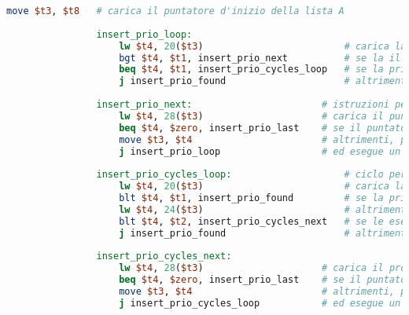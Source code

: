 \begin{center}
\begin{lstlisting}[language=mips, gobble=14, stepnumber=1]
                    move $t3, $t8   # carica il puntatore d'inizio della lista A
                    
                insert_prio_loop:
                    lw $t4, 20($t3)                         # carica la priorità del task attuale
                    bgt $t4, $t1, insert_prio_next          # se la il task attuale ha priorità maggiore del task da inserire, passa al prossimo task
                    beq $t4, $t1, insert_prio_cycles_loop   # se la priorità è uguale, inizia a scorrere comparando le esecuzioni rimanenti
                    j insert_prio_found                     # altrimenti, si è trovato il punto in cui inserire il task
                    
                insert_prio_next:                       # istruzioni per passare al prossimo task della lista A
                    lw $t4, 28($t3)                     # carica il puntatore al prossimo task della lista A
                    beq $t4, $zero, insert_prio_last    # se il puntatore è nullo, il task è da inserire come ultimo della lista
                    move $t3, $t4                       # altrimenti, passa al prossimo
                    j insert_prio_loop                  # ed esegue un altro ciclo del loop
                    
                insert_prio_cycles_loop:                    # ciclo per la comparazione su esecuzioni rimanenti sulla lista A
                    lw $t4, 20($t3)                         # carica la priorità del task attuale
                    blt $t4, $t1, insert_prio_found         # se la priorità è minore, la sfilza di task con priorità uguale è terminata e si è trovato dove inserire il task
                    lw $t4, 24($t3)                         # altrimenti, carica le esecuzioni rimanenti del task attuale
                    blt $t4, $t2, insert_prio_cycles_next   # se le esecuzioni rimanenti del task attuale sono minori (strettamente) del task da inserire, continua a cercare comparando le esec. rimanenti
                    j insert_prio_found                     # altrimenti, si è trovato dove inserire il task
                    
                insert_prio_cycles_next:
                    lw $t4, 28($t3)                     # carica il prossimo elemento della lista A
                    beq $t4, $zero, insert_prio_last    # se il puntatore è nullo, inserisce il task come ultimo della lista
                    move $t3, $t4                       # altrimenti, passa al prossimo
                    j insert_prio_cycles_loop           # ed esegue un altro ciclo (comparando su esecuzioni rimanenti)
                    

\end{lstlisting}
\end{center}

